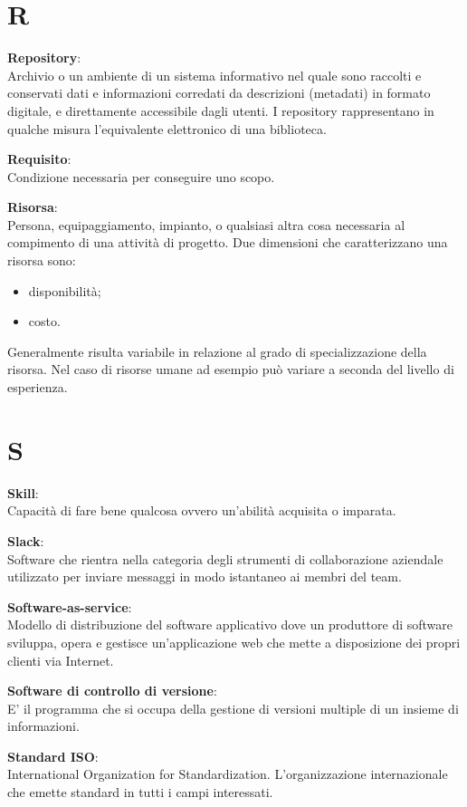 \documentclass[a4paper, oneside, openany, dvipsnames, table]{article}
\begin{document}
\newpage
\section{R}
\textbf{Repository}:\\	Archivio o un ambiente di un sistema informativo nel quale sono raccolti e conservati dati e informazioni corredati da descrizioni (metadati) in formato digitale, e direttamente accessibile dagli utenti. I repository rappresentano in qualche misura l’equivalente elettronico di una biblioteca.

\textbf{Requisito}:\\	Condizione necessaria per conseguire uno scopo.

\textbf{Risorsa}:\\	Persona, equipaggiamento, impianto, o qualsiasi altra cosa necessaria al compimento di una attività di progetto. Due dimensioni che caratterizzano una risorsa sono:
\begin{itemize}
\item disponibilità;
\item costo.
\end{itemize} 
Generalmente risulta variabile in relazione al grado di specializzazione della risorsa. Nel caso di risorse umane ad esempio può variare a seconda del livello di esperienza.


\newpage
\section{S}
\textbf{Skill}:\\	Capacità di fare bene qualcosa ovvero un'abilità acquisita o imparata.

\textbf{Slack}:\\	Software che rientra nella categoria degli strumenti di collaborazione aziendale utilizzato per inviare messaggi in modo istantaneo ai membri del team.

\textbf{Software-as-service}:\\	Modello di distribuzione del software applicativo dove un produttore di software sviluppa, opera e gestisce un'applicazione web che mette a disposizione dei propri clienti via Internet.

\textbf{Software di controllo di versione}:\\ E' il programma che si occupa della  gestione di versioni multiple di un insieme di informazioni.

\textbf{Standard ISO}:\\	International Organization for Standardization. L'organizzazione internazionale che emette standard in tutti i campi interessati.
\end{document}
